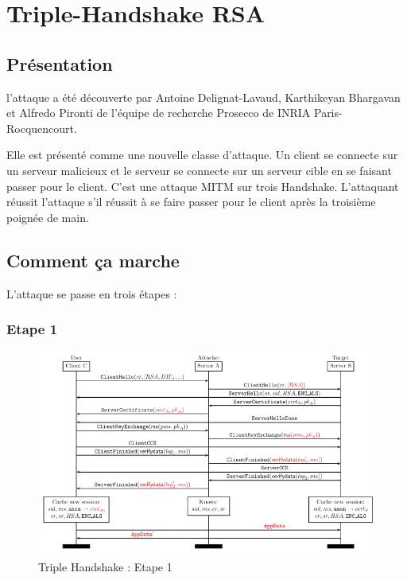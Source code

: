 \chapter{Triple-Handshake RSA}
\label{chapter:RSA}

\section{Présentation}
\label{sec:pTHR}

l'attaque a été découverte par Antoine Delignat-Lavaud, Karthikeyan Bhargavan et Alfredo Pironti 
de l'équipe de recherche Prosecco de INRIA Paris-Rocquencourt. 

Elle est présenté comme une nouvelle classe d'attaque. Un client se connecte sur un serveur malicieux et le serveur
se connecte sur un serveur cible en se faisant passer pour le client. C'est une attaque MITM sur trois Handshake.
L'attaquant réussit l'attaque s'il réussit à se faire passer pour le client après la troisième poignée de main.


\section{Comment ça marche}
\label{sec:ccmTHR}

L'attaque se passe en trois étapes :

\subsection{Etape 1}
\label{sec:e1}

\begin{figure}[h]
\label{fig:hand1}
\centering
\includegraphics[scale=0.4]{Hand1}
\caption{Triple Handshake : Etape 1}
\end{figure}

